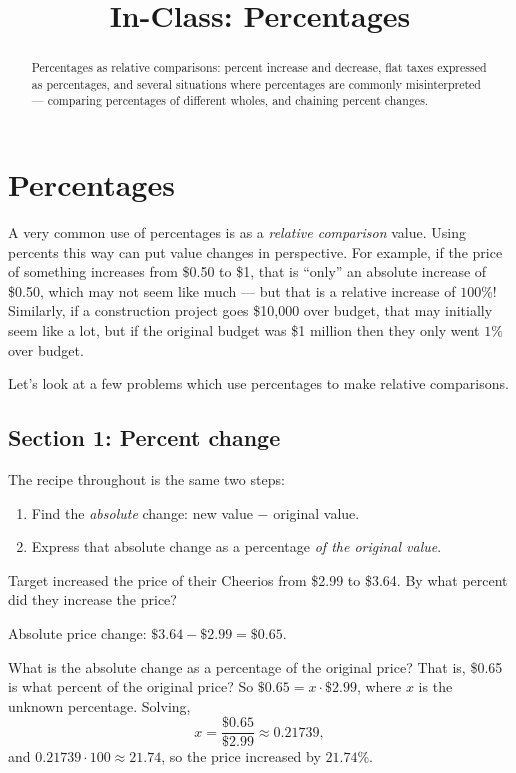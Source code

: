 \documentclass[12pt]{ximera}
\title{In-Class: Percentages}
\begin{document}
\begin{abstract}
Percentages as relative comparisons: percent increase and decrease, flat taxes
expressed as percentages, and several situations where percentages are commonly
misinterpreted --- comparing percentages of different wholes, and chaining percent
changes.
\end{abstract}
\maketitle

\section*{Percentages}

A very common use of percentages is as a \emph{relative comparison} value. Using
percents this way can put value changes in perspective. For example, if the price of
something increases from \$0.50 to \$1, that is ``only'' an absolute increase of
\$0.50, which may not seem like much --- but that is a relative increase of $100\%$!
Similarly, if a construction project goes \$10,000 over budget, that may initially
seem like a lot, but if the original budget was \$1 million then they only went $1\%$
over budget.

Let's look at a few problems which use percentages to make relative comparisons.

\subsection*{Section 1: Percent change}

The recipe throughout is the same two steps:
\begin{enumerate}
\item Find the \emph{absolute} change: new value $-$ original value.
\item Express that absolute change as a percentage \emph{of the original value}.
\end{enumerate}

\begin{example}
Target increased the price of their Cheerios from \$2.99 to \$3.64. By what percent
did they increase the price?

Absolute price change: $\$3.64 - \$2.99 = \$0.65$.

What is the absolute change as a percentage of the original price? That is, \$0.65 is
what percent of the original price? So $\$0.65 = x \cdot \$2.99$, where $x$ is the
unknown percentage. Solving,
\[
x = \frac{\$0.65}{\$2.99} \approx 0.21739,
\]
and $0.21739 \cdot 100 \approx 21.74$, so the price increased by $21.74\%$.
\end{example}
\end{document}
